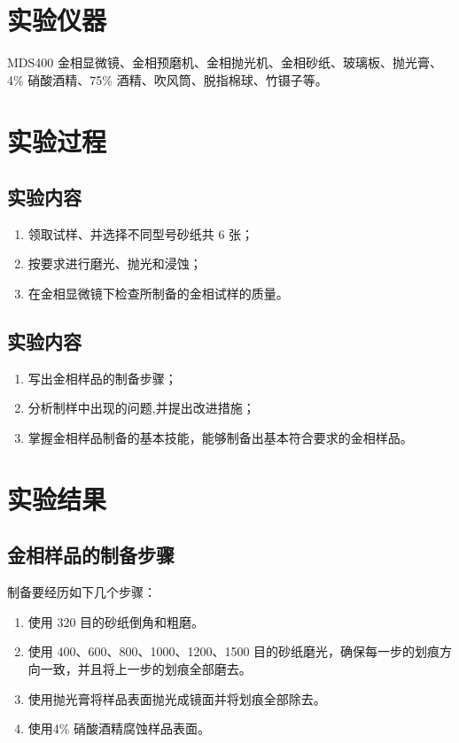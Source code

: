 \documentclass[a4paper,utf8]{article}
\begin{document}
\section{实验仪器}%
    MDS400 金相显微镜、金相预磨机、金相抛光机、金相砂纸、玻璃板、抛光膏、4\% 硝酸酒精、75\% 酒精、吹风筒、脱指棉球、竹镊子等。
\section{实验过程}%
    \subsection{实验内容}
        \begin{enumerate}
            \item 领取试样、并选择不同型号砂纸共 6 张；
            \item 按要求进行磨光、抛光和浸蚀；
            \item 在金相显微镜下检查所制备的金相试样的质量。
        \end{enumerate}
    \subsection{实验内容}
        \begin{enumerate}
            \item 写出金相样品的制备步骤；
            \item 分析制样中出现的问题,并提出改进措施；
            \item 掌握金相样品制备的基本技能，能够制备出基本符合要求的金相样品。
        \end{enumerate}
\section{实验结果}
    \subsection{金相样品的制备步骤}
        制备要经历如下几个步骤：
        \begin{enumerate}
            \item 使用 320 目的砂纸倒角和粗磨。
            \item 使用 400、600、800、1000、1200、1500 目的砂纸磨光，确保每一步的划痕方向一致，并且将上一步的划痕全部磨去。
            \item 使用抛光膏将样品表面抛光成镜面并将划痕全部除去。
            \item 使用4\% 硝酸酒精腐蚀样品表面。
        \end{enumerate}
\end{document}
